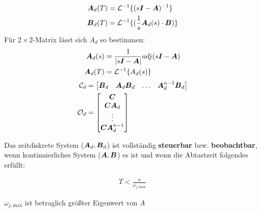         \begin{tcolorbox}[colback=white!10!white,colframe=blue!30!black,title=KOCHREZEPT: Fundamentalmatrix Berechnung] 
            \begin{align*}
            \boldsymbol{A}_d(T) &= \mathcal{L}^{-1}\{(s\boldsymbol{I}-\boldsymbol{A})^{-1}\}\\
            \boldsymbol{B}_d(T) &= \mathcal{L}^{-1}\{(\frac{1}{s}\boldsymbol{A}_d(s)\cdot \boldsymbol{B})\}
            \end{align*}
            Für $2\times2$-Matrix lässt sich $A_d$ so bestimmen:
            \begin{align*}
                \boldsymbol{A}_d(s) &= \frac{1}{|s\boldsymbol{I}-\boldsymbol{A}|} adj(s\boldsymbol{I}-\boldsymbol{A})\\
                \boldsymbol{A}_d(T) &= \mathcal{L}^{-1}\{A_d(s)\}
            \end{align*}
            \tcblower
            \begin{align*}
                \mathcal{C}_d &= \begin{bmatrix}
                \boldsymbol{B}_d & \boldsymbol{A}_d\boldsymbol{B}_d & \ldots & \boldsymbol{A}_d^{n-1}\boldsymbol{B}_d
                \end{bmatrix}\\
                \mathcal{O}_d &= \begin{bmatrix}
                \boldsymbol{C} \\\boldsymbol{C}\boldsymbol{A}_d \\ \vdots \\ \boldsymbol{C}\boldsymbol{A}_d^{n-1}
                \end{bmatrix}
            \end{align*}
            \begin{tcolorbox}[colback=white!10!white,colframe=gray!70!black,title=Steuerbarkeit und Beobachtbarkeit]
                Das zeitdiskrete System ($\boldsymbol{A}_d,\boldsymbol{B}_d$) ist vollständig \textbf{steuerbar} bzw. \textbf{beobachtbar}, wenn  kontinuierliches System ($\boldsymbol{A},\boldsymbol{B}$)  es ist und wenn die Abtastzeit folgendes erfüllt:
                 
                \begin{align*}
                    T < \frac{\pi}{\omega_{j,\text{max}}}
                \end{align*}
                
                $\omega_{j,\text{max}}$ ist betraglich größter Eigenwert von $A$
            \end{tcolorbox}    
        \end{tcolorbox}

